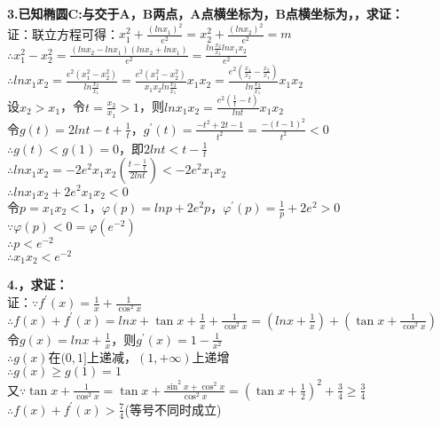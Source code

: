 \documentclass{article}
\begin{document}
    \newpage
    \noindent \textbf{3.已知椭圆C:与交于A，B两点，A点横坐标为，B点横坐标为，，求证：} \\
    证：联立方程可得：$x_1^2+\frac{\left(lnx_1\right)^2}{e^2}=x_2^2+\frac{\left(lnx_2\right)^2}{e^2}=m$ \\
    $\therefore $\quad $x_1^2-x_2^2=\frac{\left(lnx_{2}-lnx_{1}\right)\left(lnx_{2}+lnx_{1}\right)}{e^2}=\frac{ln\frac{x_2}{x_1}lnx_{1}x_{2}}{e^2}$ \\
    $\therefore $\quad $lnx_{1}x_{2}=\frac{e^{2}\left(x_1^2-x_2^2\right)}{ln\frac{x_2}{x_1}}=\frac{e^{2}\left(x_1^2-x_2^2\right)}{x_{1}x_{2}ln\frac{x_2}{x_1}}x_{1}x_{2}=\frac{e^{2}\left(\frac{x_1}{x_2}-\frac{x_2}{x_1}\right)}{ln\frac{x_2}{x_1}}x_{1}x_{2}$ \\
    设$x_{2}>x_{1}$，令$t=\frac{x_2}{x_1}>1$，则$lnx_{1}x_{2}=\frac{e^{2}\left(\frac{1}{t}-t\right)}{lnt}x_{1}x_{2}$ \\
    令$g(t)=2lnt-t+\frac{1}{t}$，$g^{'}(t)=\frac{-t^2+2t-1}{t^2}=\frac{-\left(t-1\right)^2}{t^2}<0$ \\
    $\therefore $\quad $g(t)<g(1)=0$，即$2lnt<t-\frac{1}{t}$ \\
    $\therefore $\quad $lnx_{1}x_{2}=-2e^{2}x_{1}x_{2}\left(\frac{t-\frac{1}{t}}{2lnt}\right)<-2e^{2}x_{1}x_{2}$ \\
    $\therefore $\quad $lnx_{1}x_{2}+2e^{2}x_{1}x_{2}<0$ \\
    令$p=x_{1}x_{2}<1$，$\varphi (p)=lnp+2e^{2}p$，$\varphi ^{'}(p)=\frac{1}{p}+2e^2>0$ \\
    $\because $\quad $\varphi (p)<0=\varphi (e^{-2})$ \\
    $\therefore $\quad $p<e^{-2}$ \\
    $\therefore $\quad $x_{1}x_{2}<e^{-2}$ 

    \newpage
    \noindent \textbf{4.，求证：} \\
    证：$\because $\quad $f^{'}(x)=\frac{1}{x}+\frac{1}{\cos^2 x}$ \\
    $\therefore $\quad $f(x)+f^{'}(x)=lnx+\tan x+\frac{1}{x}+\frac{1}{\cos^2 x}=\left(lnx+\frac{1}{x}\right)+\left(\tan x+\frac{1}{\cos^2 x}\right)$ \\
    令$g(x)=lnx+\frac{1}{x}$，则$g^{'}(x)=1-\frac{1}{x^2}$ \\
    $\therefore $\quad $g(x)$在$(0,1]$上递减，$(1,+\infty )$上递增 \\
    $\therefore $\quad $g(x)\geqslant g(1)=1$ \\
    又$\because $\quad $\tan x+\frac{1}{\cos^2 x}=\tan x+\frac{\sin^2 x+\cos^2 x}{\cos^2 x}=\left(\tan x+\frac{1}{2}\right)^2+\frac{3}{4}\geqslant \frac{3}{4}$ \\
    $\therefore $\quad $f(x)+f^{'}(x)>\frac{7}{4}$\quad (等号不同时成立) \\
    
\end{document}
